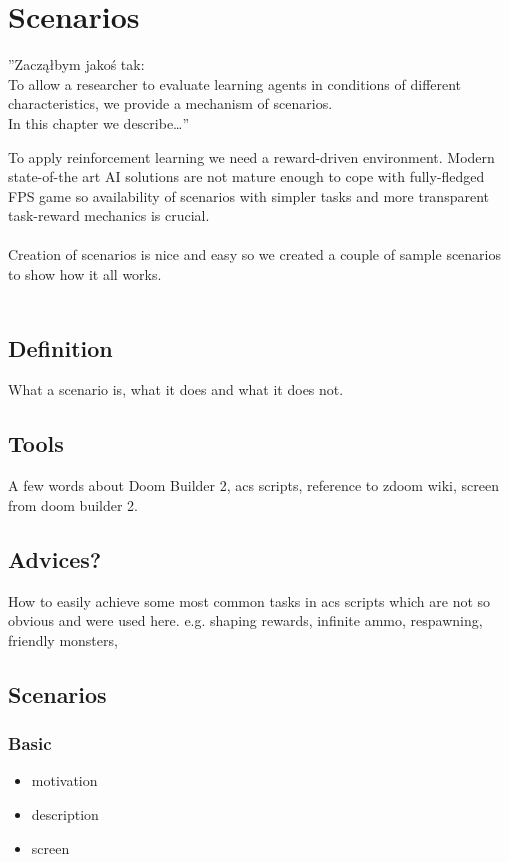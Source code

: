 
\chapter{Scenarios}


''Zacząłbym jakoś tak:
\\
To allow a researcher to evaluate learning agents in conditions of different characteristics, we provide a mechanism of scenarios.
\\
In this chapter we describe…''

To apply reinforcement learning we need a reward-driven environment. Modern state-of-the art AI solutions are not mature enough to cope with fully-fledged FPS game so availability of scenarios with simpler tasks and more transparent task-reward mechanics is crucial.\\
\\
Creation of scenarios is nice and easy so we created a couple of sample scenarios to show how it all works.\\
\\
\section{Definition}
What a scenario is, what it does and what it does not.

\section{Tools}
A few words about Doom Builder 2, acs scripts, reference to zdoom wiki, screen from doom builder 2.

\section{Advices?}
How to easily achieve some most common tasks in acs scripts which are not so obvious and were used here.
e.g. shaping rewards, infinite ammo, respawning, friendly monsters, 
\section{Scenarios}

\subsection{Basic}
\begin{itemize}
	\item motivation
	\item description
	\item screen
\end{itemize}

